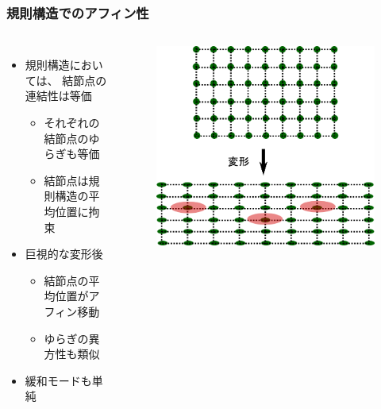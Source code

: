\documentclass[11pt, dvipdfmx]{beamer}
\begin{document}
\begin{frame}
\frametitle{規則構造でのアフィン性}

\begin{columns}[totalwidth=\linewidth]

\begin{itemize}
\item
規則構造においては、
結節点の\alert{連結性は等価}
	\begin{itemize}
	\item
	それぞれの結節点のゆらぎも等価
	\item
	結節点は\alert{規則構造の平均位置に拘束}
\end{itemize}
\item
巨視的な変形後
	\begin{itemize}
	\item
	結節点の\alert{平均位置がアフィン移動}
	\item
	ゆらぎの異方性も類似
	\end{itemize}
\item
緩和モードも単純
\end{itemize}

\begin{figure}
\centering
\includegraphics[width=\columnwidth]{./fig/reglar_NW_2.png}
\end{figure}
\end{columns}

\end{frame}
\end{document}
